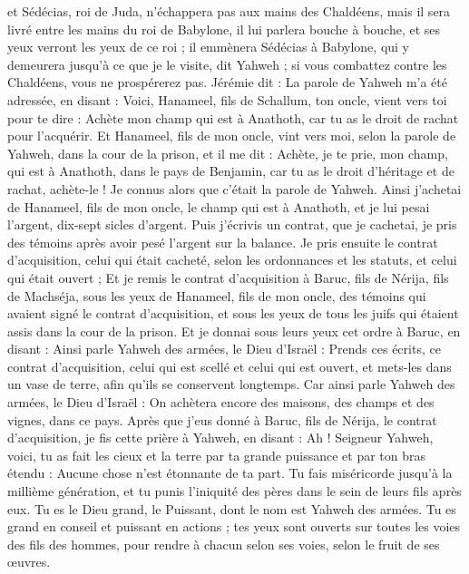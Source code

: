 \begin{multicols}{2}
et Sédécias, roi de Juda, n'échappera pas aux mains des Chaldéens, mais il sera livré entre les mains du roi de Babylone, il lui parlera bouche à bouche, et ses yeux verront les yeux de ce roi ;
il emmènera Sédécias à Babylone, qui y demeurera jusqu'à ce que je le visite, dit Yahweh ; si vous combattez contre les Chaldéens, vous ne prospérerez pas.
Jérémie dit : La parole de Yahweh m'a été adressée, en disant :
Voici, Hanameel, fils de Schallum, ton oncle, vient vers toi pour te dire : Achète mon champ qui est à Anathoth, car tu as le droit de rachat pour l'acquérir.
Et Hanameel, fils de mon oncle, vint vers moi, selon la parole de Yahweh, dans la cour de la prison, et il me dit : Achète, je te prie, mon champ, qui est à Anathoth, dans le pays de Benjamin, car tu as le droit d'héritage et de rachat, achète-le ! Je connus alors que c'était la parole de Yahweh.
Ainsi j'achetai de Hanameel, fils de mon oncle, le champ qui est à Anathoth, et je lui pesai l'argent, dix-sept sicles d'argent.
Puis j'écrivis un contrat, que je cachetai, je pris des témoins après avoir pesé l'argent sur la balance.
Je pris ensuite le contrat d'acquisition, celui qui était cacheté, selon les ordonnances et les statuts, et celui qui était ouvert ;
Et je remis le contrat d'acquisition à Baruc, fils de Nérija, fils de Machséja, sous les yeux de Hanameel, fils de mon oncle, des témoins qui avaient signé le contrat d'acquisition, et sous les yeux de tous les juifs qui étaient assis dans la cour de la prison.
Et je donnai sous leurs yeux cet ordre à Baruc, en disant :
Ainsi parle Yahweh des armées, le Dieu d'Israël : Prends ces écrits, ce contrat d'acquisition, celui qui est scellé et celui qui est ouvert, et mets-les dans un vase de terre, afin qu'ils se conservent longtemps.
Car ainsi parle Yahweh des armées, le Dieu d'Israël : On achètera encore des maisons, des champs et des vignes, dans ce pays.
Après que j'eus donné à Baruc, fils de Nérija, le contrat d'acquisition, je fis cette prière à Yahweh, en disant :
Ah ! Seigneur Yahweh, voici, tu as fait les cieux et la terre par ta grande puissance et par ton bras étendu : Aucune chose n'est étonnante de ta part.
Tu fais miséricorde jusqu'à la millième génération, et tu punis l'iniquité des pères dans le sein de leurs fils après eux. Tu es le Dieu grand, le Puissant, dont le nom est Yahweh des armées.
Tu es grand en conseil et puissant en actions ; tes yeux sont ouverts sur toutes les voies des fils des hommes, pour rendre à chacun selon ses voies, selon le fruit de ses œuvres.

\end{multicols}

